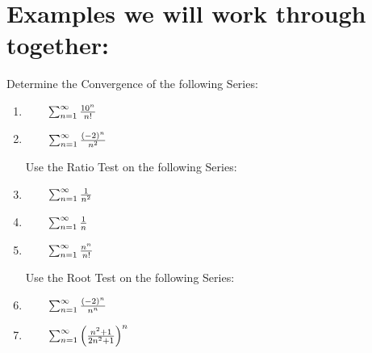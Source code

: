\documentclass[10pt]{article}
\begin{document}



\section*{Examples we will work through together:}

Determine the Convergence of the following Series:
\begin{enumerate}%

\item  \(\qquad\sum_{n=1}^\infty \frac{10^n}{n!}\)
\vfill

\item  \(\qquad\sum_{n=1}^\infty \frac{(-2)^n}{n^2}\)
\vfill



\pagebreak

\hspace{-.75in} Use the Ratio Test on the following Series:

\item  \(\qquad\sum_{n=1}^\infty \frac{1}{n^2}\)
\vfill

\item  \(\qquad\sum_{n=1}^\infty \frac{1}{n}\)

\vfill

\item \(\qquad\sum_{n=1}^\infty	\frac{n^n}{n!}\)
\vfill

\hspace*{-.75in}Use the Root Test on the following Series:

\item  \(\qquad\sum_{n=1}^\infty \frac{(-2)^n}{n^n}\)

\vfill
\item \(\qquad\sum_{n=1}^\infty	\left(\frac{n^2+1}{2n^2+1}\right)^n\)
\vfill

\end{enumerate}

\end{document}
